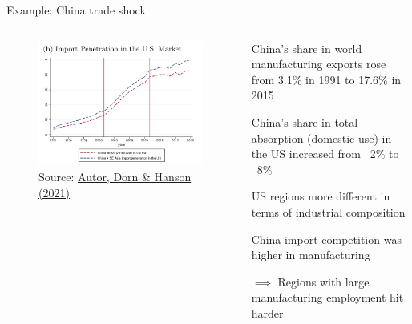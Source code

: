 \documentclass[notes,11pt, aspectratio=169, xcolor=table]{beamer}
\newenvironment{wideitemize}{\itemize\addtolength{\itemsep}{10pt}}{\enditemize}
\begin{document}
\begin{frame}{Example: China trade shock}


\begin{columns}[T] %
\begin{column}{.45\textwidth}
\centering
\begin{figure}
    \centering
    \includegraphics[width=\linewidth]{figs/china-trade-shock-penetration.png} 
        \caption{Source: \href{https://www.nber.org/system/files/working_papers/w29401/w29401.pdf}{Autor, Dorn \& Hanson (2021)}}

\end{figure}
\end{column}%
\hfill%
\begin{column}{.55\textwidth}
{\small
\begin{wideitemize}
    \item China's share in world manufacturing exports rose from 3.1\% in 1991 to 17.6\% in 2015

    \item China's share in total absorption (domestic use) in the US increased from  ~2\% to ~8\%

    \item US regions more different in terms of industrial composition

    \item China import competition was higher in manufacturing
    
    \item $\implies$ Regions with large manufacturing employment hit harder
    
\end{wideitemize}
}
\end{column}%
\end{columns}

\end{frame}
\end{document}
